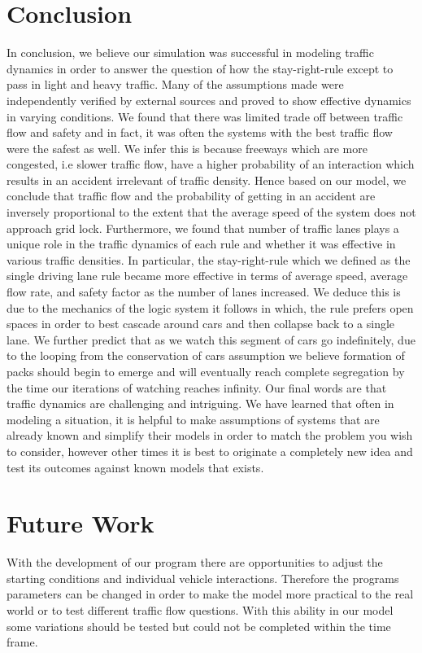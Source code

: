 \documentclass{amsart}
\begin{document}
\section{\bfseries{Conclusion}}
	In conclusion, we believe our simulation was successful in modeling traffic dynamics in order to answer the question of how the stay-right-rule except to pass in light and heavy traffic. Many of the assumptions made were independently verified by external sources and proved to show effective dynamics in varying conditions. We found that there was limited trade off between traffic flow and safety and in fact, it was often the systems with the best traffic flow were the safest as well. We infer this is because freeways which are more congested, i.e slower traffic flow, have a higher probability of an interaction which results in an accident irrelevant of traffic density. Hence based on our model, we conclude that traffic flow and the probability of getting in an accident are inversely proportional to the extent that the average speed of the system does not approach grid lock. Furthermore, we found that number of traffic lanes plays a unique role in the traffic dynamics of each rule and whether it was effective in various traffic densities. In particular, the stay-right-rule which we defined as the single driving lane rule became more effective in terms of average speed, average flow rate, and safety factor as the number of lanes increased. We deduce this is due to the mechanics of the logic system it follows in which, the rule prefers open spaces in order to best cascade around cars and then collapse back to a single lane. We further predict that as we watch this segment of cars go indefinitely, due to the looping from the conservation of cars assumption we believe formation of packs should begin to emerge and will eventually reach complete segregation by the time our iterations of watching reaches infinity. Our final words are that traffic dynamics are challenging and intriguing. We have learned that often in modeling a situation, it is helpful to make assumptions of systems that are already known and simplify their models in order to match the problem you wish to consider, however other times it is best to originate a completely new idea and test its outcomes against known models that exists. 

\section{\bfseries{Future Work}}
	With the development of our program there are opportunities to adjust the starting conditions and individual vehicle interactions. Therefore the programs parameters can be changed in order to make the model more practical to the real world or to test different traffic flow questions. With this ability in our model some variations should be tested but could not be completed within the time frame. 
\end{document}

